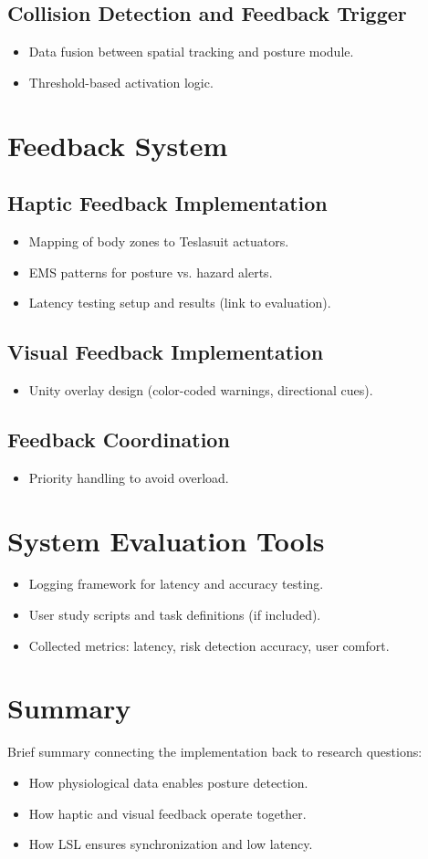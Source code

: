 \subsection{Collision Detection and Feedback Trigger}
\begin{itemize}
    \item Data fusion between spatial tracking and posture module.
    \item Threshold-based activation logic.
\end{itemize}

\section{Feedback System}
\subsection{Haptic Feedback Implementation}
\begin{itemize}
    \item Mapping of body zones to Teslasuit actuators.
    \item EMS patterns for posture vs. hazard alerts.
    \item Latency testing setup and results (link to evaluation).
\end{itemize}

\subsection{Visual Feedback Implementation}
\begin{itemize}
    \item Unity overlay design (color-coded warnings, directional cues).
\end{itemize}

\subsection{Feedback Coordination}
\begin{itemize}
    \item Priority handling to avoid overload.
\end{itemize}

\section{System Evaluation Tools}
\begin{itemize}
    \item Logging framework for latency and accuracy testing.
    \item User study scripts and task definitions (if included).
    \item Collected metrics: latency, risk detection accuracy, user comfort.
\end{itemize}

\section{Summary}
Brief summary connecting the implementation back to research questions:
\begin{itemize}
    \item How physiological data enables posture detection.
    \item How haptic and visual feedback operate together.
    \item How LSL ensures synchronization and low latency.
\end{itemize}
